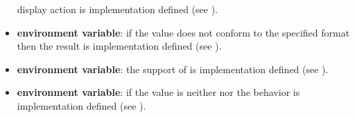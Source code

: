 \begin{itemize}
      display action is implementation defined (see 
      ).
\item {} \textbf{environment variable}: if the value 
      does not conform to the specified format then the result is implementation 
      defined (see ).
\item {} \textbf{environment variable}: the support of 
       is implementation defined (see 
      ).
\item {} \textbf{environment variable}: if the value is neither
       nor  the behavior is implementation defined 
      (see ).
\end{itemize}

